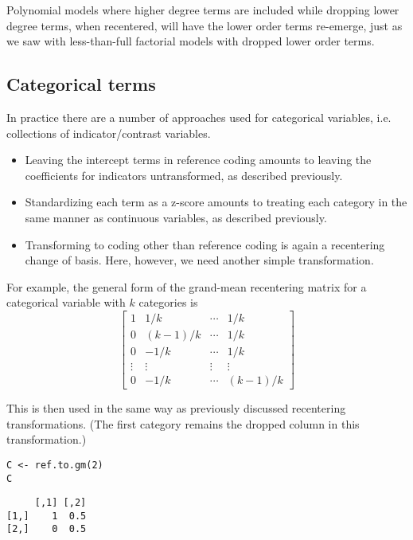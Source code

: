\documentclass[]{article}
\providecommand{\tightlist}{%
  \setlength{\itemsep}{0pt}\setlength{\parskip}{0pt}}
\begin{document}
Polynomial models where higher degree terms are included while dropping
lower degree terms, when recentered, will have the lower order terms
re-emerge, just as we saw with less-than-full factorial models with
dropped lower order terms.

\subsection{Categorical terms}\label{categorical-terms}

In practice there are a number of approaches used for categorical
variables, i.e. collections of indicator/contrast variables.

\begin{itemize}
\tightlist
\item
  Leaving the intercept terms in reference coding amounts to leaving the
  coefficients for indicators untransformed, as described previously.
\item
  Standardizing each term as a z-score amounts to treating each category
  in the same manner as continuous variables, as described previously.
\item
  Transforming to coding other than reference coding is again a
  recentering change of basis. Here, however, we need another simple
  transformation.
\end{itemize}

For example, the general form of the grand-mean recentering matrix for a
categorical variable with \(k\) categories is \[
\begin{bmatrix}
1 &1/k     &\cdots &1/k \\
0 &(k-1)/k &\cdots &1/k \\
0 &-1/k    &\cdots &1/k \\
\vdots &\vdots &\vdots &\vdots \\
0 &-1/k    &\cdots &(k-1)/k
\end{bmatrix}
\]

This is then used in the same way as previously discussed recentering
transformations. (The first category remains the dropped column in this
transformation.)

\begin{verbatim}
C <- ref.to.gm(2)
C
\end{verbatim}

\begin{verbatim}
     [,1] [,2]
[1,]    1  0.5
[2,]    0  0.5
\end{verbatim}
\end{document}
